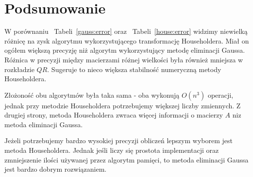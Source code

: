 \section{Podsumowanie}

W porównaniu ~Tabeli~\ref{gauss:error} oraz ~Tabeli~\ref{house:error} widzimy niewielką różnicę na zysk algorytmu wykorzystującego transformację Householdera. Miał on ogółem większą precyzję niż algorytm wykorzystujący metodę eliminacji Gaussa. Różnica w precyzji między macierzami różnej wielkości była również mniejsza w rozkładzie $QR$. Sugeruje to nieco większa stabilność numeryczną metody Householdera.

Złożoność obu algorytmów była taka sama - oba wykonują $O(n^3)$ operacji, jednak przy metodzie Householdera potrzebujemy większej liczby zmiennych. Z drugiej strony, metoda Householdera zwraca więcej informacji o macierzy $A$ niz metoda eliminacji Gaussa.

Jeżeli potrzebujemy bardzo wysokiej precyzji obliczeń lepszym wyborem jest metoda Householdera. Jednak jeśli liczy się prostota implementacji oraz zmniejszenie ilości używanej przez algorytm pamięci, to metoda eliminacji Gaussa jest bardzo dobrym rozwiązaniem.

\koniec